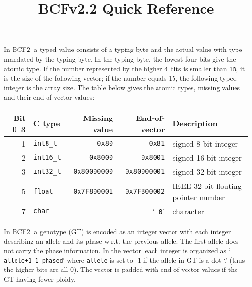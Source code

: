 \documentclass[10pt]{article}
\title{BCFv2.2 Quick Reference}
\author{}
\date{}
\begin{document}
\maketitle

{\small
In BCF2, a typed value consists of a typing byte and the actual value with type
mandated by the typing byte. In the typing byte, the lowest four bits give the
atomic type. If the number represented by the higher 4 bits is smaller than 15,
it is the size of the following vector; if the number equals 15, the following
typed integer is the array size. The table below gives the atomic types,
missing values and their end-of-vector values:
\begin{center}
{\small\begin{tabular}{rlrrl}
\hline
Bit 0--3 & C type   & Missing value    & End-of-vector    & Description \\
\hline
1 & {\tt int8\_t}   & {\tt 0x80}       & {\tt 0x81}       & signed 8-bit integer \\
2 & {\tt int16\_t}  & {\tt 0x8000}     & {\tt 0x8001}     & signed 16-bit integer \\
3 & {\tt int32\_t}  & {\tt 0x80000000} & {\tt 0x80000001} & signed 32-bit integer \\
5 & {\tt float}     & {\tt 0x7F800001} & {\tt 0x7F800002} & IEEE 32-bit floating pointer number \\
7 & {\tt char}      &                  & `{\tt \char92 0}'& character \\
\hline
\end{tabular}}
\end{center}

In BCF2, a genotype (GT) is encoded as an integer vector with each integer
describing an allele and its phase w.r.t. the previous allele. The first allele
does not carry the phase information. In the vector, each integer is organized
as `{\tt {} allele+1 1 phased}' where
{\tt allele} is set to -1 if the allele in GT is a dot `.' (thus the higher
bits are all 0). The vector is padded with end-of-vector values if the GT
having fewer ploidy.
}
\end{document}
